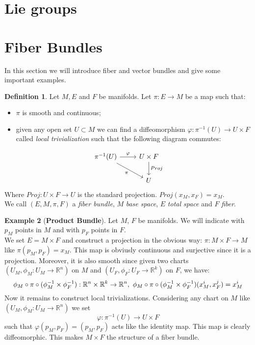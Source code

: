 \documentclass[12pt,a4paper]{report}
\theoremstyle{definition}
\newtheorem{Def}{Definition}[chapter]
\theoremstyle{Theorem}
\theoremstyle{definition}
\newtheorem{Ex}[Def]{Example}
\theoremstyle{definition}
\begin{document}
		\section{Lie groups}
		\section{Fiber Bundles}
		In this section we will introduce fiber and vector bundles and give some important examples.
			\begin{Def}
				Let $M, E$ and $F$ be manifolds. Let $\pi: E\rightarrow M$ be a map such that:
				\begin{itemize}
					\item $\pi$ is smooth and continuous;
					\item given any open set $U\subset M$ we can find a diffeomorphism $\varphi: \pi^{-1}(U)\rightarrow U\times F$ called \textit{local trivialization} such that the following diagram commutes:
				\end{itemize}
						\[
				\begin{tikzcd}
					\pi^{-1}(U) \arrow{r}{\varphi} \arrow[swap]{dr}{\pi} & U\times F \arrow{d}{Proj}\\
					& U 
				\end{tikzcd}
				\]
				Where $Proj: U\times F\rightarrow U$ is the standard projection. $Proj(x_M,x_F)=x_M$.\\
				We call $(E,M,\pi,F)$ a \textit{fiber bundle}, $M$ \textit{base space}, $E$ \textit{total space} and $F$ \textit{fiber}.
			\end{Def}
			\begin{Ex}[\textbf{Product Bundle}]\label{Ex_1.1}
				Let $M$, $F$ be manifolds. We will indicate with $p_M$ points in $M$ and with $p_F$ points in $F$.\\ 
				We set $E=M\times F$ and construct a projection in the obvious way: 
				$\pi:M\times F\rightarrow M$ like $\pi(p_M,p_F)=x_M$. This map is obviusly continuous and surjective since it is a projection. Moreover, it is also smooth since given two charts $(U_M,\phi_M:U_M\rightarrow \mathbb{R}^n)$ on $M$ and $(U_F,\phi_F:U_F\rightarrow \mathbb{R}^k)$ on $F$, we have:
				$$\phi_M\circ \pi\circ (\phi_M^{-1}\times \phi_F^{-1}):\mathbb{R}^n\times\mathbb{R}^k\rightarrow\mathbb{R}^n,\hbox{ }\phi_M\circ \pi\circ (\phi_M^{-1}\times \phi_F^{-1})(x^i_M,x^j_F)=x^i_M$$
				Now it remains to construct local trivializations. Considering any chart on $M$ like $(U_M,\phi_M:U_M\rightarrow \mathbb{R}^n)$ we set
				$$\varphi:\pi^{-1}(U)\rightarrow U\times F$$
				such that $\varphi(p_M,p_F)=(p_M,p_F)$ acts like the identity map. This map is clearly diffeomorphic.
				This makes $M\times F$ the structure of a fiber bundle.
			\end{Ex}
\end{document}
